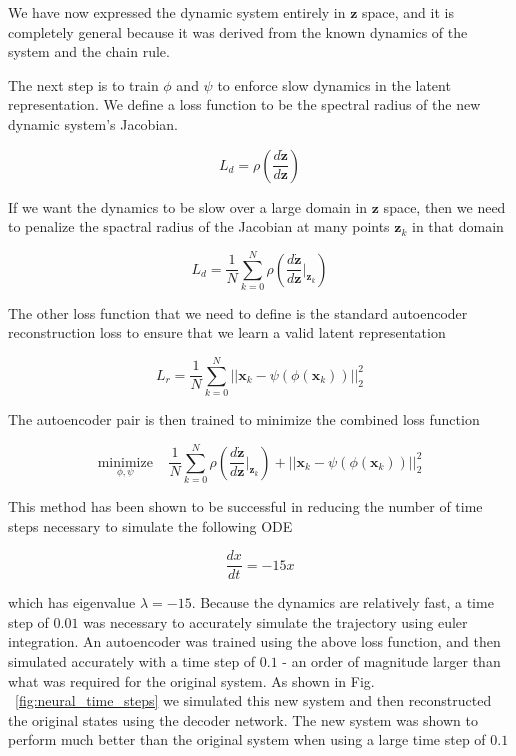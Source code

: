 \documentclass[12pt, letterpaper]{article}
\begin{document}
We have now expressed the dynamic system entirely in $\mathbf{z}$ space, and it is completely general because it was derived from the known dynamics of the system and the chain rule. 

The next step is to train $\phi$ and $\psi$ to enforce slow dynamics in the latent representation. We define a loss function to be the spectral radius of the new dynamic system's Jacobian. 

\begin{equation}
    L_d = \rho\left( \frac{d \dot{\mathbf{z}}}{d \mathbf{z}} \right) 
\end{equation}

If we want the dynamics to be slow over a large domain in $\mathbf{z}$ space, then we need to penalize the spactral radius of the Jacobian at many points $\mathbf{z}_k$ in that domain

\begin{equation}
    L_d = \frac{1}{N} \overset{N}{\underset{k=0}{\sum}} \rho\left( \frac{d \dot{\mathbf{z}}}{d \mathbf{z}} \Big|_{\mathbf{z}_k} \right) 
\end{equation}

The other loss function that we need to define is the standard autoencoder reconstruction loss to ensure that we learn a valid latent representation

\begin{equation}
    L_r = \frac{1}{N} \overset{N}{\underset{k=0}{\sum}} ||\mathbf{x}_k - \psi(\phi(\mathbf{x}_k))||_2^2
\end{equation}

The autoencoder pair is then trained to minimize the combined loss function

\begin{equation}
        \underset{\phi, \psi}{\text{minimize}} \; \; \; \; \frac{1}{N} \overset{N}{\underset{k=0}{\sum}}\rho\left( \frac{d \dot{\mathbf{z}}}{d \mathbf{z}} \Big|_{\mathbf{z}_k} \right) + ||\mathbf{x}_k - \psi(\phi(\mathbf{x}_k))||_2^2 
\end{equation}

This method has been shown to be successful in reducing the number of time steps necessary to simulate the following ODE

\begin{equation}
    \frac{dx}{dt} = -15x
\end{equation}

which has eigenvalue $\lambda = -15$.  Because the dynamics are relatively fast, a time step of $0.01$ was necessary to accurately simulate the trajectory using euler integration.  An autoencoder was trained using the above loss function, and then simulated accurately with a time step of $0.1$ - an order of magnitude larger than what was required for the original system.  As shown in Fig. ~\ref{fig:neural_time_steps} we simulated this new system and then reconstructed the original states using the decoder network.  The new system was shown to perform much better than the original system when using a large time step of $0.1$
\end{document}

